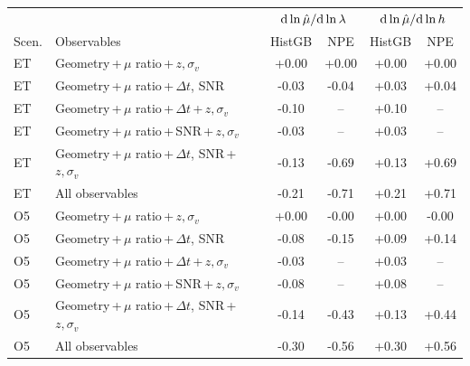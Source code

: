 \begin{tabular*}{\linewidth}{@{\extracolsep{\fill}}llcccc@{}}
\toprule
 & & \multicolumn{2}{c}{${\rm d}\ln\hat\mu/{\rm d}\ln\lambda$} & \multicolumn{2}{c}{${\rm d}\ln\hat\mu/{\rm d}\ln h$} \\
Scen. & Observables & HistGB & NPE & HistGB & NPE \\
\midrule
ET & Geometry\,+\,$\mu$ ratio\,+\,$z,\sigma_v$ & +0.00 & +0.00 & +0.00 & +0.00 \\
ET & Geometry\,+\,$\mu$ ratio\,+\,$\Delta t$, SNR & -0.03 & -0.04 & +0.03 & +0.04 \\
ET & Geometry\,+\,$\mu$ ratio\,+\,$\Delta t$\,+\,$z,\sigma_v$ & -0.10 & -- & +0.10 & -- \\
ET & Geometry\,+\,$\mu$ ratio\,+\,SNR\,+\,$z,\sigma_v$ & -0.03 & -- & +0.03 & -- \\
ET & Geometry\,+\,$\mu$ ratio\,+\,$\Delta t$, SNR\,+\,$z,\sigma_v$ & -0.13 & -0.69 & +0.13 & +0.69 \\
ET & All observables & -0.21 & -0.71 & +0.21 & +0.71 \\
O5 & Geometry\,+\,$\mu$ ratio\,+\,$z,\sigma_v$ & +0.00 & -0.00 & +0.00 & -0.00 \\
O5 & Geometry\,+\,$\mu$ ratio\,+\,$\Delta t$, SNR & -0.08 & -0.15 & +0.09 & +0.14 \\
O5 & Geometry\,+\,$\mu$ ratio\,+\,$\Delta t$\,+\,$z,\sigma_v$ & -0.03 & -- & +0.03 & -- \\
O5 & Geometry\,+\,$\mu$ ratio\,+\,SNR\,+\,$z,\sigma_v$ & -0.08 & -- & +0.08 & -- \\
O5 & Geometry\,+\,$\mu$ ratio\,+\,$\Delta t$, SNR\,+\,$z,\sigma_v$ & -0.14 & -0.43 & +0.13 & +0.44 \\
O5 & All observables & -0.30 & -0.56 & +0.30 & +0.56 \\
\bottomrule
\end{tabular*}